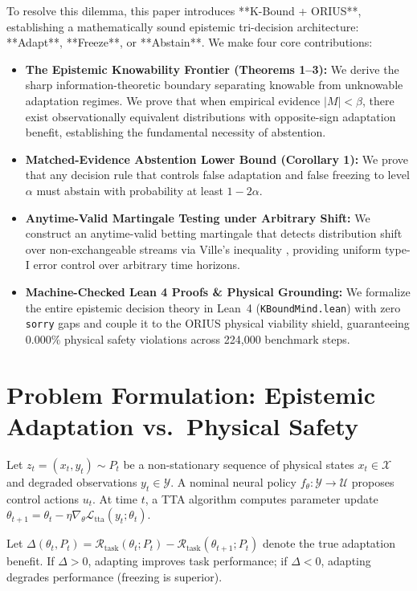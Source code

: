 \documentclass[10pt]{article}
\begin{document}
To resolve this dilemma, this paper introduces **K-Bound + ORIUS**, establishing a mathematically sound epistemic tri-decision architecture: **Adapt**, **Freeze**, or **Abstain**. We make four core contributions:
\begin{itemize}
    \item \textbf{The Epistemic Knowability Frontier (Theorems 1--3):} We derive the sharp information-theoretic boundary separating knowable from unknowable adaptation regimes. We prove that when empirical evidence $|M| < \beta$, there exist observationally equivalent distributions with opposite-sign adaptation benefit, establishing the fundamental necessity of abstention.
    \item \textbf{Matched-Evidence Abstention Lower Bound (Corollary 1):} We prove that any decision rule that controls false adaptation and false freezing to level $\alpha$ must abstain with probability at least $1 - 2\alpha$.
    \item \textbf{Anytime-Valid Martingale Testing under Arbitrary Shift:} We construct an anytime-valid betting martingale that detects distribution shift over non-exchangeable streams via Ville's inequality \cite{ville_1939}, providing uniform type-I error control over arbitrary time horizons.
    \item \textbf{Machine-Checked Lean 4 Proofs \& Physical Grounding:} We formalize the entire epistemic decision theory in Lean~4 (\texttt{KBoundMind.lean}) with zero \texttt{sorry} gaps and couple it to the ORIUS physical viability shield, guaranteeing $0.000\%$ physical safety violations across 224,000 benchmark steps.
\end{itemize}

\section{Problem Formulation: Epistemic Adaptation vs.\ Physical Safety}
Let $z_t = (x_t, y_t) \sim P_t$ be a non-stationary sequence of physical states $x_t \in \mathcal{X}$ and degraded observations $y_t \in \mathcal{Y}$. A nominal neural policy $f_\theta : \mathcal{Y} \to \mathcal{U}$ proposes control actions $u_t$. At time $t$, a TTA algorithm computes parameter update $\theta_{t+1} = \theta_t - \eta \nabla_\theta \mathcal{L}_{\mathrm{tta}}(y_t; \theta_t)$.

Let $\Delta(\theta_t, P_t) = \mathcal{R}_{\mathrm{task}}(\theta_t; P_t) - \mathcal{R}_{\mathrm{task}}(\theta_{t+1}; P_t)$ denote the true adaptation benefit. If $\Delta > 0$, adapting improves task performance; if $\Delta < 0$, adapting degrades performance (freezing is superior).
\end{document}
